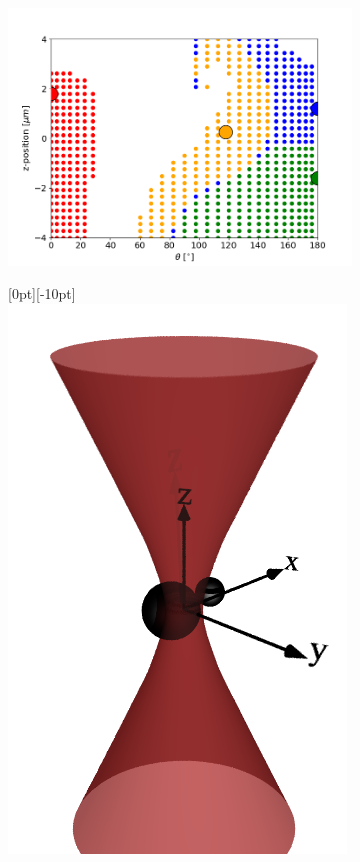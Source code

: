 \begin{figure}[h!]
	\centering
	\begin{subfigure}{0.67\linewidth}
		\includegraphics[width=\linewidth]{off_axis_trap.png}
	\end{subfigure}
	\begin{subfigure}{0.32\linewidth}
		\raisebox{0pt}[0pt][-10pt]{\makebox{}\includegraphics[width=\linewidth, keepaspectratio]{off_axis_render.png}}

\end{subfigure}
\end{figure}
